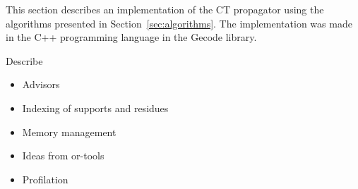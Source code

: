 \documentclass[a4paper,11pt]{article}
\newcommand{\Todo}[1]{{\color{blue}#1}}
\newcommand{\Chapref}[1]{Section~\ref{#1}}
\numberwithin{equation}{section}
\begin{document}



This section describes an implementation of the CT propagator using the algorithms
presented in \Chapref{sec:algorithms}. The implementation was made in the C++ programming
language in the Gecode library.

\Todo{
  Describe
  \begin{itemize}
    \item Advisors
    \item Indexing of supports and residues
    \item Memory management
    \item Ideas from or-tools
    \item Profilation
  \end{itemize}
}
\end{document}
